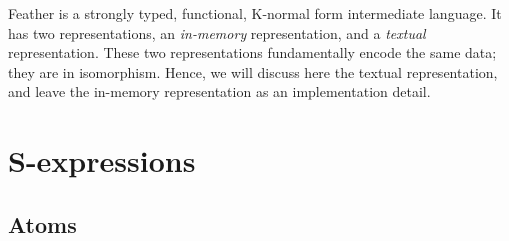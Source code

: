 \documentclass[UKenglish, 11pt, a4paper, parskip=half]{scrbook}
\begin{document}
Feather is a strongly typed, functional, K-normal form intermediate language. It has two representations, an \textit{in-memory} representation, and a \textit{textual} representation.
These two representations fundamentally encode the same data; they are in isomorphism.
Hence, we will discuss here the textual representation, and leave the in-memory representation as an implementation detail.

\section{S-expressions}

\subsection{Atoms}
\label{sec:prim_types}
\end{document}

